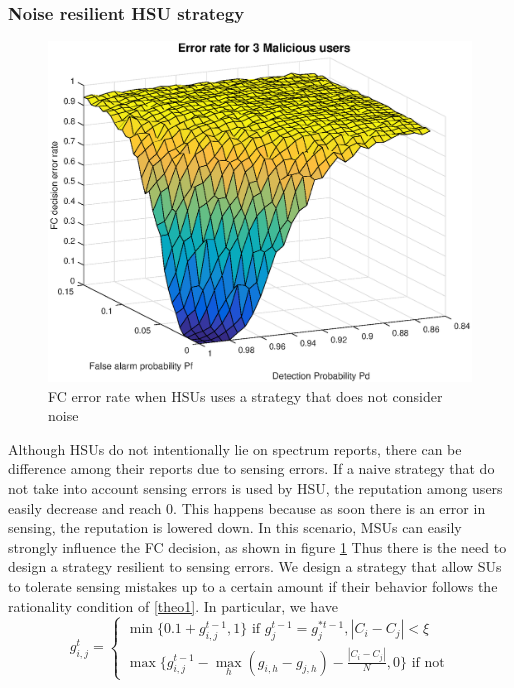 \documentclass[letterpaper, 10 pt, conference]{ieeeconf}  %
\begin{document}
\subsubsection{Noise resilient HSU strategy}
\begin{figure}
\centering
\includegraphics[scale=0.4]{figures/notolerance.eps}
\caption{FC error rate when HSUs uses a strategy that does not consider noise}\label{notolerance}
\end{figure}
Although HSUs do not intentionally lie on spectrum reports, there can be difference among their reports due to sensing errors. If a naive strategy that do not take into account sensing errors is used by HSU, the reputation among users easily decrease and reach 0. This happens because as soon there is an error in sensing, the reputation is lowered down. 
In this scenario, MSUs can easily strongly influence the FC decision, as shown in figure \ref{notolerance}%
Thus there is the need to design a strategy resilient to sensing errors. We design a strategy that allow SUs to tolerate sensing mistakes up to a certain amount if their behavior follows the rationality condition of \ref{theo1}. 
In particular, we have
\begin{equation}
\label{hsustrat}
g^t_{i,j}=
\begin{cases}
\min\{0.1+g^{t-1}_{i,j},1\}
\text{ if } g_j^{t-1}=g^{*{t-1}}_j,|C_i-C_j|<\xi \\
\max\{ g^{t-1}_{i,j}-\max\limits_h {(g_{i,h}-g_{j,h})}-\frac{|C_i-C_j|}{N},0\}\text{ if not}
\end{cases}
\end{equation}
\end{document}
